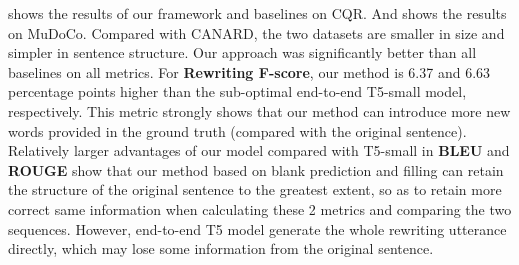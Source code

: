 \begin{table}[ht!]
\setlength\tabcolsep{3pt}
\centering
\scriptsize
\caption{Results on MuDoCo.}
\label{tab:mudoco-result}
\end{table}

 shows 
the results of our framework and baselines on CQR. And  shows the results on MuDoCo. Compared with CANARD, the two datasets are smaller in size and simpler in sentence structure. Our approach was significantly better than all baselines on all metrics. For \textbf{Rewriting F-score}, our method is 6.37 and 6.63 percentage points higher than the sub-optimal end-to-end T5-small model, respectively. This metric strongly shows that our method can introduce more new words provided in the ground truth (compared with the original sentence). Relatively larger advantages of our model compared with T5-small in \textbf{BLEU} and \textbf{ROUGE} show that 
our method based on blank prediction and filling can retain the structure of the original sentence to the greatest extent, so as to retain more correct same information when calculating these 2 metrics and comparing the two sequences.
However, end-to-end T5 model generate the whole rewriting utterance directly, which may lose some information from the original sentence.

